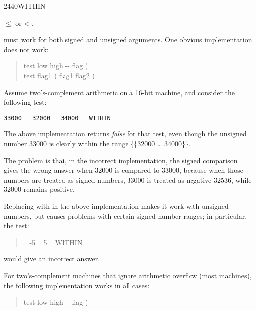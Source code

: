 \begin{worddef}{2440}{WITHIN}
\begin{rationale}
		\begin{center}
			 $\le$  or  < .
		\end{center}
		 must work for both signed and unsigned arguments.
		One obvious implementation does not work:
		\begin{quote}\ttfamily
			\word{:}   test low high -{}- flag ) \\
			\tab {}     test flag1 )
				    flag1 flag2 )
				 \\
			\word{;}
		\end{quote}
		Assume two's-complement arithmetic on a 16-bit machine, and
		consider the following test:

		\tab \texttt{33000 ~ 32000 ~ 34000 ~ WITHIN}

		The above implementation returns \emph{false} for that test,
		even though the unsigned number 33000 is clearly within the
		range \{\{32000 {\ldots} 34000\}\}.

		The problem is that, in the incorrect implementation, the
		signed comparison  gives the wrong answer when 32000
		is compared to 33000, because when those numbers are treated
		as signed numbers, 33000 is treated as negative 32536, while
		32000 remains positive.

		Replacing  with  in the above implementation
		makes it work with unsigned numbers, but causes problems with
		certain signed number ranges; in particular, the test:
		\begin{quote} ~ -5 ~ 5 ~ WITHIN
		\end{quote}
		would give an incorrect answer.

		For two's-complement machines that ignore arithmetic overflow
		(most machines), the following implementation works in all
		cases:
		\begin{quote}\ttfamily
			\word{:}   test low high -{}- flag )	~
				 \word{-}  \word{-}   ~
			\word{;}
		\end{quote}
	\end{rationale}
\end{worddef}


